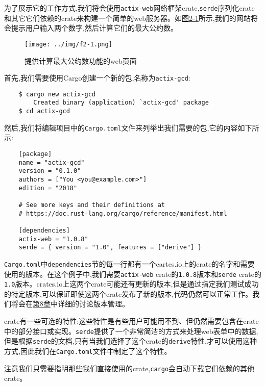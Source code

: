 为了展示它的工作方式,我们将会使用\texttt{actix-web}网络框架crate,\texttt{serde}序列化crate和其它它们依赖的crate来构建一个简单的web服务器。如\hyperref[f2-1]{图2-1}所示,我们的网站将会提示用户输入两个数字,然后计算它们的最大公约数。
\begin{figure}[htbp]
    \centering
    \texttt{[image: ../img/f2-1.png]}
    \caption{提供计算最大公约数功能的web页面}
    \label{f2-1}
\end{figure}

首先,我们需要使用Cargo创建一个新的包,名称为\texttt{actix-gcd}:
\begin{verbatim}
    $ cargo new actix-gcd
        Created binary (application) `actix-gcd' package
    $ cd actix-gcd
\end{verbatim}

然后,我们将编辑项目中的\texttt{Cargo.toml}文件来列举出我们需要的包,它的内容如下所示:
\begin{verbatim}
    [package]
    name = "actix-gcd"
    version = "0.1.0"
    authors = ["You <you@example.com>"]
    edition = "2018"

    # See more keys and their definitions at
    # https://doc.rust-lang.org/cargo/reference/manifest.html

    [dependencies]
    actix-web = "1.0.8"
    serde = { version = "1.0", features = ["derive"] }
\end{verbatim}

\texttt{Cargo.toml}中\texttt{dependencies}节的每一行都有一个cartes.io上的crate的名字和需要使用的版本。在这个例子中,我们需要\texttt{actix-web} crate的\texttt{1.0.8}版本和\texttt{serde} crate的\texttt{1.0}版本。crates.io上这两个crate可能还有更新的版本,但是通过指定我们测试成功的特定版本,可以保证即使这两个crate发布了新的版本,代码仍然可以正常工作。我们将会在\hyperref[ch08]{第8章}中详细的讨论版本管理。

crate有一些可选的特性:这些特性是有些用户可能用不到、但仍然需要包含在crate中的部分接口或实现。\texttt{serde}提供了一个非常简洁的方式来处理web表单中的数据,但是根据\texttt{serde}的文档,只有当我们选择了这个crate的\texttt{derive}特性,才可以使用这种方式,因此我们在\texttt{Cargo.toml}文件中制定了这个特性。

注意我们只需要指明那些我们直接使用的crate,\texttt{cargo}会自动下载它们依赖的其他crate。

